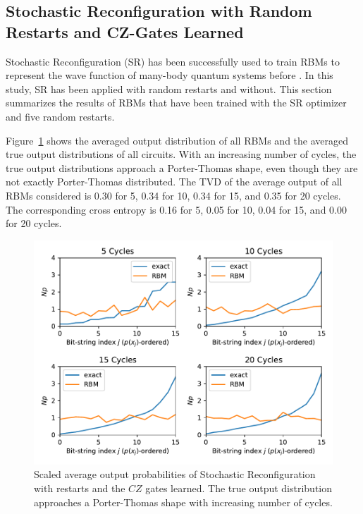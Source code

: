 \subsection{Stochastic Reconfiguration with Random Restarts and CZ-Gates Learned}

Stochastic Reconfiguration (SR) has been successfully used to train RBMs to represent the wave function 
of many-body quantum systems before \cite{carleo2017solving,medvidovic2020classical}. In this study, SR has been applied with random restarts 
and without. 
This section summarizes the results of RBMs that have been trained with the SR optimizer and five random 
restarts.

Figure~\ref{fig:sr_restarts_avgPDF} shows the averaged output distribution of all RBMs and 
the averaged true output distributions of all circuits. With an increasing number of cycles, the 
true output distributions approach a Porter-Thomas shape, even though they are not exactly Porter-Thomas 
distributed.
The TVD of the average output of all RBMs considered 
is 0.30 for 5, 0.34 for 10, 0.34 for 15, and 0.35 for 20 cycles. The corresponding cross entropy is 
0.16 for 5, 0.05 for 10, 0.04 for 15, and 0.00 for 20 cycles.

\begin{figure}[H]
  \centering
  \includegraphics[width=\textwidth]{figures/results/SR-restarts-learned/avgPDF.pdf}
  \caption[Scaled Average Output Probabilities of All RBMs Trained with Stochastic Reconfiguration with Random Restarts and $CZ$ Gates Learned]{
    Scaled average output probabilities of Stochastic Reconfiguration with restarts and the $CZ$ gates learned. The true 
    output distribution approaches a Porter-Thomas shape with increasing number of cycles.}
  \label{fig:sr_restarts_avgPDF}
\end{figure}

